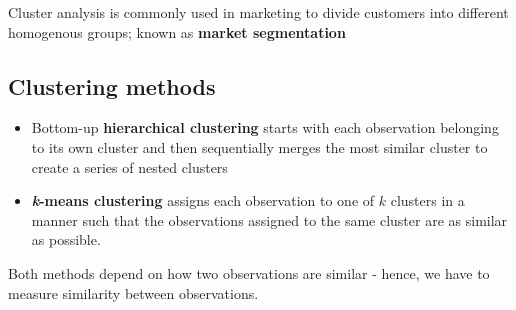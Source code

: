 \documentclass{report}
\begin{document}
\noindent Cluster analysis is commonly used in marketing to divide customers into different homogenous groups; known as \textbf{market segmentation}
\subsection{Clustering methods}
\begin{itemize}
  \item Bottom-up \textbf{hierarchical clustering} starts with each observation belonging to its own cluster and then sequentially merges the most similar cluster to create a series of nested clusters 
  \item \textbf{\textit{k}-means clustering} assigns each observation to one of $k$ clusters in a manner such that the observations assigned to the same cluster are as similar as possible.
\end{itemize}
\bigbreak \noindent
Both methods depend on how two observations are similar - hence, we have to measure similarity between observations.
\end{document}
